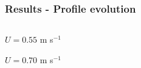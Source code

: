 \documentclass{beamer}
\begin{document}
\begin{frame}
  \frametitle{Results - Profile evolution}

  \vspace{-1cm}

  \begin{columns}[t]

    \begin{column}{0.3\paperwidth}

      \centering

      $U = 0.55$ m s$^{-1}$


      \vspace{1cm}

      $U = 0.70$ m s$^{-1}$



\end{column}
\end{columns}
\end{frame}
\end{document}
